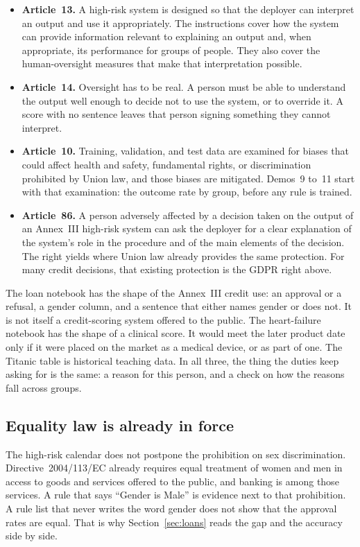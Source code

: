 \documentclass[11pt]{article}
\begin{document}
\begin{itemize}
  \item \textbf{Article~13.} A high-risk system is designed so that the deployer can interpret an output and use it appropriately. The instructions cover how the system can provide information relevant to explaining an output and, when appropriate, its performance for groups of people. They also cover the human-oversight measures that make that interpretation possible.
  \item \textbf{Article~14.} Oversight has to be real. A person must be able to understand the output well enough to decide not to use the system, or to override it. A score with no sentence leaves that person signing something they cannot interpret.
  \item \textbf{Article~10.} Training, validation, and test data are examined for biases that could affect health and safety, fundamental rights, or discrimination prohibited by Union law, and those biases are mitigated. Demos~9 to~11 start with that examination: the outcome rate by group, before any rule is trained.
  \item \textbf{Article~86.} A person adversely affected by a decision taken on the output of an Annex~III high-risk system can ask the deployer for a clear explanation of the system's role in the procedure and of the main elements of the decision. The right yields where Union law already provides the same protection. For many credit decisions, that existing protection is the GDPR right above.
\end{itemize}

The loan notebook has the shape of the Annex~III credit use: an approval or a refusal, a gender column, and a sentence that either names gender or does not. It is not itself a credit-scoring system offered to the public. The heart-failure notebook has the shape of a clinical score. It would meet the later product date only if it were placed on the market as a medical device, or as part of one. The Titanic table is historical teaching data. In all three, the thing the duties keep asking for is the same: a reason for this person, and a check on how the reasons fall across groups.

\subsection{Equality law is already in force}

The high-risk calendar does not postpone the prohibition on sex discrimination. Directive~2004/113/EC already requires equal treatment of women and men in access to goods and services offered to the public, and banking is among those services. A rule that says ``Gender is Male'' is evidence next to that prohibition. A rule list that never writes the word gender does not show that the approval rates are equal. That is why Section~\ref{sec:loans} reads the gap and the accuracy side by side.
\end{document}
